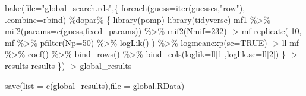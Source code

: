 \documentclass[
]{article}
\newenvironment{Shaded}{\begin{snugshade}}{\end{snugshade}}
\newcommand{\AttributeTok}[1]{\textcolor[rgb]{0.77,0.63,0.00}{#1}}
\newcommand{\ConstantTok}[1]{\textcolor[rgb]{0.00,0.00,0.00}{#1}}
\newcommand{\DecValTok}[1]{\textcolor[rgb]{0.00,0.00,0.81}{#1}}
\newcommand{\FunctionTok}[1]{\textcolor[rgb]{0.00,0.00,0.00}{#1}}
\newcommand{\NormalTok}[1]{#1}
\newcommand{\OtherTok}[1]{\textcolor[rgb]{0.56,0.35,0.01}{#1}}
\newcommand{\SpecialCharTok}[1]{\textcolor[rgb]{0.00,0.00,0.00}{#1}}
\newcommand{\StringTok}[1]{\textcolor[rgb]{0.31,0.60,0.02}{#1}}
\begin{document}
\begin{Shaded}
\begin{Highlighting}[]
\FunctionTok{bake}\NormalTok{(}\AttributeTok{file=}\StringTok{"global\_search.rds"}\NormalTok{,\{}
  \FunctionTok{foreach}\NormalTok{(}\AttributeTok{guess=}\FunctionTok{iter}\NormalTok{(guesses,}\StringTok{"row"}\NormalTok{), }\AttributeTok{.combine=}\NormalTok{rbind) }\SpecialCharTok{\%dopar\%}\NormalTok{ \{}
  \FunctionTok{library}\NormalTok{(pomp)}
  \FunctionTok{library}\NormalTok{(tidyverse)}
\NormalTok{  mf1 }\SpecialCharTok{\%\textgreater{}\%}
    \FunctionTok{mif2}\NormalTok{(}\AttributeTok{params=}\FunctionTok{c}\NormalTok{(guess,fixed\_params)) }\SpecialCharTok{\%\textgreater{}\%}
    \FunctionTok{mif2}\NormalTok{(}\AttributeTok{Nmif=}\DecValTok{232}\NormalTok{) }\OtherTok{{-}\textgreater{}}\NormalTok{ mf}
  \FunctionTok{replicate}\NormalTok{(}
    \DecValTok{10}\NormalTok{,}
\NormalTok{    mf }\SpecialCharTok{\%\textgreater{}\%} \FunctionTok{pfilter}\NormalTok{(}\AttributeTok{Np=}\DecValTok{50}\NormalTok{) }\SpecialCharTok{\%\textgreater{}\%} \FunctionTok{logLik}\NormalTok{()}
\NormalTok{    ) }\SpecialCharTok{\%\textgreater{}\%}
    \FunctionTok{logmeanexp}\NormalTok{(}\AttributeTok{se=}\ConstantTok{TRUE}\NormalTok{) }\OtherTok{{-}\textgreater{}}\NormalTok{ ll}
\NormalTok{  mf }\SpecialCharTok{\%\textgreater{}\%} \FunctionTok{coef}\NormalTok{() }\SpecialCharTok{\%\textgreater{}\%} \FunctionTok{bind\_rows}\NormalTok{() }\SpecialCharTok{\%\textgreater{}\%}
    \FunctionTok{bind\_cols}\NormalTok{(}\AttributeTok{loglik=}\NormalTok{ll[}\DecValTok{1}\NormalTok{],}\AttributeTok{loglik.se=}\NormalTok{ll[}\DecValTok{2}\NormalTok{])}
\NormalTok{\} }\OtherTok{{-}\textgreater{}}\NormalTok{ results}
\NormalTok{  results}
\NormalTok{\}) }\OtherTok{{-}\textgreater{}}\NormalTok{ global\_results}

\FunctionTok{save}\NormalTok{(}\AttributeTok{list =} \FunctionTok{c}\NormalTok{(}\StringTok{\textquotesingle{}global\_results\textquotesingle{}}\NormalTok{),}\AttributeTok{file =} \StringTok{\textquotesingle{}global.RData\textquotesingle{}}\NormalTok{)}
\end{Highlighting}
\end{Shaded}
\end{document}
